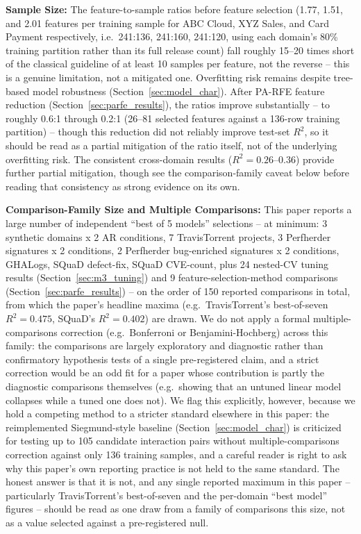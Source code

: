 \documentclass[technologies,article,submit,pdftex,moreauthors]{Definitions/mdpi}
\begin{document}
\textbf{Sample Size:} The feature-to-sample ratios before feature
selection (1.77, 1.51, and 2.01 features per training sample for ABC
Cloud, XYZ Sales, and Card Payment respectively, i.e.\ 241:136, 241:160,
241:120, using each domain's 80\% training partition rather than its
full release count) fall roughly 15--20 times short of the classical guideline of at
least 10 samples per feature, not the reverse -- this is a genuine
limitation, not a mitigated one. Overfitting risk remains
despite tree-based model robustness
(Section~\ref{sec:model_char}). After PA-RFE feature reduction
(Section~\ref{sec:parfe_results}), the ratios improve substantially --
to roughly 0.6:1 through 0.2:1 (26--81 selected features against a
136-row training partition) -- though this reduction did not reliably
improve test-set \(R^2\), so it should be read as a partial mitigation
of the ratio itself, not of the underlying overfitting risk. The consistent
cross-domain results (\(R^2 = 0.26\)--\(0.36\)) provide further partial
mitigation, though see the comparison-family caveat below before
reading that consistency as strong evidence on its own.

\textbf{Comparison-Family Size and Multiple Comparisons:} This paper
reports a large number of independent ``best of 5 models'' selections --
at minimum: 3 synthetic domains x 2 AR conditions, 7 TravisTorrent
projects, 3 Perfherder signatures x 2 conditions, 2 Perfherder
bug-enriched signatures x 2 conditions, GHALogs, SQuaD defect-fix, SQuaD
CVE-count, plus 24 nested-CV tuning results (Section~\ref{sec:m3_tuning})
and 9 feature-selection-method comparisons (Section~\ref{sec:parfe_results})
-- on the order of 150 reported comparisons in total, from which the
paper's headline maxima (e.g.\ TravisTorrent's best-of-seven
\(R^2=0.475\), SQuaD's \(R^2=0.402\)) are drawn. We do not apply a formal
multiple-comparisons correction (e.g.\ Bonferroni or Benjamini-Hochberg)
across this family: the comparisons are largely exploratory and
diagnostic rather than confirmatory hypothesis tests of a single
pre-registered claim, and a strict correction would be an odd fit for a
paper whose contribution is partly the diagnostic comparisons themselves
(e.g.\ showing that an untuned linear model collapses while a tuned one
does not). We flag this explicitly, however, because we hold a competing
method to a stricter standard elsewhere in this paper: the reimplemented
Siegmund-style baseline (Section~\ref{sec:model_char}) is criticized for
testing up to 105 candidate interaction pairs without
multiple-comparisons correction against only 136 training samples, and a
careful reader is right to ask why this paper's own reporting practice
is not held to the same standard. The honest answer is that it is not,
and any single reported maximum in this paper -- particularly
TravisTorrent's best-of-seven and the per-domain ``best model'' figures
-- should be read as one draw from a family of comparisons this size,
not as a value selected against a pre-registered null.
\end{document}
